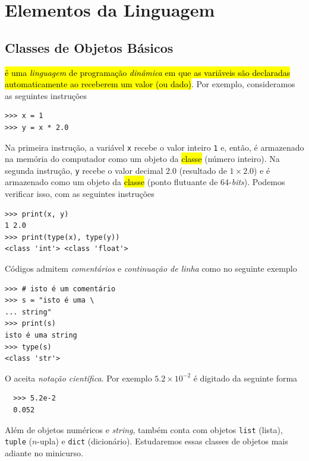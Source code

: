\documentclass[12pt]{article}
\begin{document}
\section{Elementos da Linguagem}\label{sec_elem}

\subsection{Classes de Objetos Básicos}

\hl{{\python} é uma \emph{linguagem} de programação \emph{dinâmica} em que as variáveis são declaradas automaticamente ao receberem um valor (ou dado)}. Por exemplo, consideramos as seguintes instruções
\begin{lstlisting}
>>> x = 1
>>> y = x * 2.0
\end{lstlisting}
Na primeira instrução, a variável \texttt{x} recebe o valor inteiro \texttt{1} e, então, é armazenado na memória do computador como um objeto da \hl{classe {\PYTHONint}} (número inteiro). Na segunda instrução, \texttt{y} recebe o valor decimal $2.0$ (resultado de $1\times 2.0$) e é armazenado como um objeto da \hl{classe {\PYTHONfloat}} (ponto flutuante de 64-{\it bits}). Podemos verificar isso, com as seguintes instruções
\begin{lstlisting}
>>> print(x, y)
1 2.0
>>> print(type(x), type(y))
<class 'int'> <class 'float'>
\end{lstlisting}

\begin{obs}
  Códigos {\python} admitem \emph{comentários} e \emph{continuação de linha} como no seguinte exemplo
\begin{lstlisting}
>>> # isto é um comentário
>>> s = "isto é uma \
... string"
>>> print(s)
isto é uma string
>>> type(s)
<class 'str'>
\end{lstlisting}
\end{obs}
\begin{obs}
  O {\python} aceita \emph{notação científica}. Por exemplo $5.2\times 10^{-2}$ é digitado da seguinte forma
  \begin{lstlisting}
  >>> 5.2e-2
  0.052
  \end{lstlisting}
\end{obs}

Além de objetos numéricos e {\it string}, {\python} também conta com objetos \lstinline+list+ (lista), \lstinline+tuple+ ($n$-upla) e \lstinline+dict+ (dicionário). Estudaremos essas classes de objetos mais adiante no minicurso.
\end{document}
